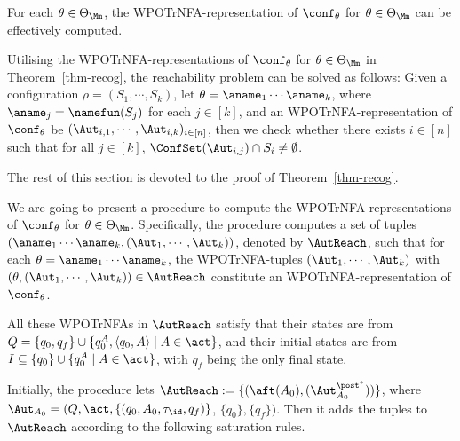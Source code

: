 \begin{theorem}\label{thm-recog}
For each $\theta \in \Theta_\Mm$, the WPOTrNFA-representation of $\conf_\theta$ for $\theta \in \Theta_\Mm$ can be effectively computed.
\end{theorem} 

Utilising the WPOTrNFA-representations of $\conf_\theta$ for $\theta \in \Theta_\Mm$ in Theorem~\ref{thm-recog}, the reachability problem can be solved as follows: Given a configuration $\rho = (S_1, \cdots, S_k)$, let $\theta = \aname_1 \cdots \aname_k$, where $\aname_j=\namefun(S_j)$ for each $j \in [k]$, and an WPOTrNFA-representation of $\conf_\theta$ be $(\Aut_{i,1},\cdots,\Aut_{i,k})_{i \in [n]}$, then we check whether there exists $i \in [n]$ such that  for all $j \in [k]$, 
$\ConfSet(\Aut_{i,j})\cap S_i\neq\emptyset$.


The rest of this section is devoted to the proof of Theorem~\ref{thm-recog}. 


We are going to present a procedure to compute the WPOTrNFA-representations of $\conf_\theta$ for $\theta \in \Theta_\Mm$. 
Specifically, the procedure computes a set of tuples $(\aname_1 \cdots \aname_k, (\Aut_1, \cdots, \Aut_k))$, denoted by $\AutReach$, such that for each $\theta =  \aname_1 \cdots \aname_k$, the WPOTrNFA-tuples $(\Aut_1, \cdots, \Aut_k)$ with $(\theta, (\Aut_1, \cdots, \Aut_k)) \in \AutReach$ constitute an WPOTrNFA-representation of $\conf_\theta$. 

All these WPOTrNFAs in $\AutReach$ satisfy that their states are from $Q = \{q_0,q_f\} \cup \{q_0^{A}, \langle q_0, A\rangle\mid  A \in \act\}$, and their initial states are from $I\subseteq \{q_0\}\cup\{q_0^{A}\mid  A \in \act\}$, with $q_f$ being the only final state.
%

Initially, the procedure lets $\AutReach := \{(\aft(A_0),(\Aut_{A_0}^{\post^*}))\}$, where $\Aut_{A_0} = (Q, \act, \{(q_0, A_0, \tau_{\id}, q_f)\}$, $\{q_0\},\{q_f\})$.
Then it adds the tuples to $\AutReach$ according to the following saturation rules.

